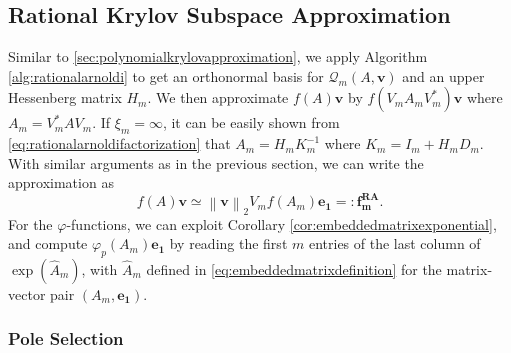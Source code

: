 \subsection{Rational Krylov Subspace Approximation}
\label{sec:rationalkrylovapproximation}
Similar to \autoref{sec:polynomialkrylovapproximation}, we apply Algorithm \ref{alg:rationalarnoldi}
to get an orthonormal basis for $\mathcal{Q}_m(A, \mathbf{v})$ and an upper Hessenberg matrix $H_m$.
We then approximate $f(A)\mathbf{v}$ by $f(V_m A_m V_m^*)\mathbf{v}$ where $A_m = V_m^* A V_m$.
If $\xi_m = \infty$, it can be easily shown from \eqref{eq:rationalarnoldifactorization} that
$A_m = H_m K_m^{-1}$ where $K_m = I_m + H_m D_m$. With similar arguments as in the previous
section, we can write the approximation as
\begin{equation}
    \label{eq:rationalkrylovapproximation}
    f(A)\mathbf{v} \simeq \left\| \mathbf{v} \right\|_{2} V_m f(A_m) \mathbf{e_1} =: \mathbf{f_{m}^{RA}}.
\end{equation}
For the $\varphi$-functions, we can exploit Corollary \ref{cor:embeddedmatrixexponential},
and compute $\varphi_p(A_m) \mathbf{e_1}$ by reading the first $m$ entries of the last column of
$\exp(\hat{A}_m)$, with $\hat{A}_m$ defined in \eqref{eq:embeddedmatrixdefinition}
for the matrix-vector pair $(A_m, \mathbf{e_1})$.

\subsubsection{Pole Selection}

